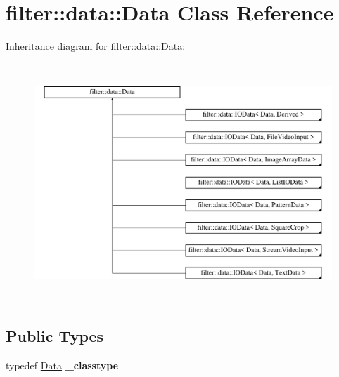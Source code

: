 \hypertarget{classfilter_1_1data_1_1_data}{}\section{filter\+:\+:data\+:\+:Data Class Reference}
\label{classfilter_1_1data_1_1_data}
Inheritance diagram for filter\+:\+:data\+:\+:Data\+:\begin{figure}[H]
\begin{center}
\leavevmode
\includegraphics[height=9.000000cm]{d4/d8e/classfilter_1_1data_1_1_data}
\end{center}
\end{figure}
\subsection*{Public Types}
\begin{DoxyCompactItemize}
\item 
\mbox{\label{classfilter_1_1data_1_1_data_ad9c9ffde07366691a9e9a1de3147a8a7}} 
typedef \hyperlink{classfilter_1_1data_1_1_data}{Data} {\bfseries \+\_\+classtype}
\end{DoxyCompactItemize}

